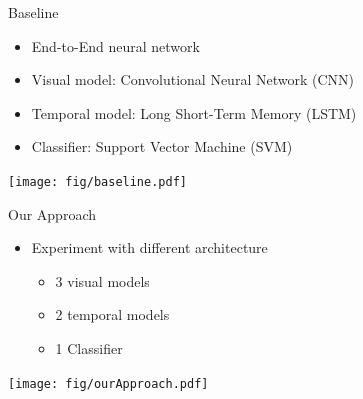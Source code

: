 \documentclass[xcolor=table]{beamer}
\begin{document}
\begin{frame}{Baseline}
    \begin{itemize}
        \item End-to-End neural network
        \item Visual model: Convolutional Neural Network (CNN)
        \item Temporal model: Long Short-Term Memory (LSTM)
        \item Classifier: Support Vector Machine (SVM)
    \end{itemize}
    \begin{center}
    \texttt{[image: fig/baseline.pdf]}   
    \end{center}
\end{frame}

\begin{frame}{Our Approach}
    \begin{itemize}
        \item Experiment with different architecture
        \begin{itemize}
            \item 3 visual models 
            \item 2 temporal models
            \item 1 Classifier
        \end{itemize}
    \end{itemize}
    \begin{center}
    \texttt{[image: fig/ourApproach.pdf]}   
    \end{center}
\end{frame}
\end{document}
